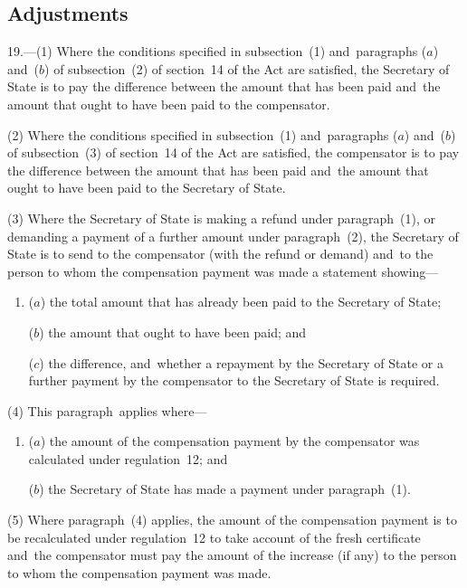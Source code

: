 \documentclass[12pt,a4paper]{article}
\begin{document}
\subsection[19. Adjustments]{Adjustments}

19.---(1)  Where the conditions specified in subsection~(1) and~paragraphs ($a$)  and~($b$)  of subsection~(2) of section~14 of the Act are satisfied, the Secretary of State is to pay the difference between the amount that has been paid and~the amount that ought to have been paid to the compensator.

(2) Where the conditions specified in subsection~(1) and~paragraphs ($a$)  and~($b$)  of subsection~(3) of section~14 of the Act are satisfied, the compensator is to pay the difference between the amount that has been paid and~the amount that ought to have been paid to the Secretary of State.

(3) Where the Secretary of State is making a refund under paragraph~(1), or demanding a payment of a further amount under paragraph~(2), the Secretary of State is to send to the compensator (with the refund or demand) and~to the person to whom the compensation payment was made a statement showing—
\begin{enumerate}\item[]
($a$) the total amount that has already been paid to the Secretary of State;

($b$) the amount that ought to have been paid; and

($c$) the difference, and~whether a repayment by the Secretary of State or a further payment by the compensator to the Secretary of State is required.
\end{enumerate}

(4) This paragraph~applies where—
\begin{enumerate}\item[]
($a$) the amount of the compensation payment by the compensator was calculated under regulation~12; and

($b$) the Secretary of State has made a payment under paragraph~(1).
\end{enumerate}

(5) Where paragraph~(4) applies, the amount of the compensation payment is to be recalculated under regulation~12 to take account of the fresh certificate and~the compensator must pay the amount of the increase (if any) to the person to whom the compensation payment was made.
\end{document}
